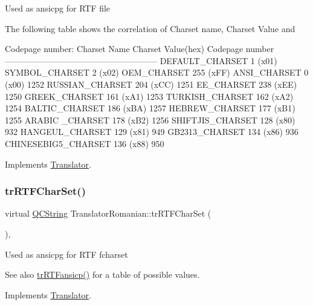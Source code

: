 Used as ansicpg for R\+TF file

The following table shows the correlation of Charset name, Charset Value and 
\begin{DoxyPre}
Codepage number:
Charset Name       Charset Value(hex)  Codepage number
------------------------------------------------------
DEFAULT\_CHARSET           1 (x01)
SYMBOL\_CHARSET            2 (x02)
OEM\_CHARSET             255 (xFF)
ANSI\_CHARSET              0 (x00)            1252
RUSSIAN\_CHARSET         204 (xCC)            1251
EE\_CHARSET              238 (xEE)            1250
GREEK\_CHARSET           161 (xA1)            1253
TURKISH\_CHARSET         162 (xA2)            1254
BALTIC\_CHARSET          186 (xBA)            1257
HEBREW\_CHARSET          177 (xB1)            1255
ARABIC \_CHARSET         178 (xB2)            1256
SHIFTJIS\_CHARSET        128 (x80)             932
HANGEUL\_CHARSET         129 (x81)             949
GB2313\_CHARSET          134 (x86)             936
CHINESEBIG5\_CHARSET     136 (x88)             950
\end{DoxyPre}
 

Implements \mbox{\hyperlink{class_translator_a9953a4c0e6a4fc7d017abcd5c2939e0f}{Translator}}.

\mbox{\label{class_translator_romanian_ab1c47ae1478057aef6c28f39e8853091}} 
\subsubsection{\texorpdfstring{trRTFCharSet()}{trRTFCharSet()}}
{\footnotesize\ttfamily virtual \mbox{\hyperlink{class_q_c_string}{Q\+C\+String}} Translator\+Romanian\+::tr\+R\+T\+F\+Char\+Set (\begin{DoxyParamCaption}{ }\end{DoxyParamCaption})\hspace{0.3cm}{\ttfamily [inline]}, {\ttfamily [virtual]}}

Used as ansicpg for R\+TF fcharset \begin{DoxySeeAlso}{See also}
\mbox{\hyperlink{class_translator_romanian_ab7c503188161175b30f783b9c15f924f}{tr\+R\+T\+Fansicp()}} for a table of possible values. 
\end{DoxySeeAlso}


Implements \mbox{\hyperlink{class_translator_afad391f3cbfb5ce6332b7239f8e2049a}{Translator}}.

